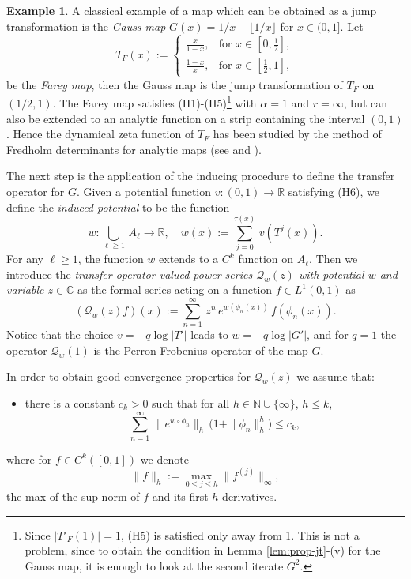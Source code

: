 \documentclass[11pt]{amsart}
\theoremstyle{definition}
\theoremstyle{remark}
\theoremstyle{definition}
\newtheorem{example}[theorem]{Example}
\numberwithin{equation}{section}
\newcommand{\R}{\mathbb R}
\newcommand{\N}{\mathbb N}
\newcommand{\C}{\mathbb C}
\newcommand{\QQ}{\mathcal{Q}}
\begin{document}
\begin{example}\label{ex:farey-gauss}
A classical example of a map which can be obtained as a jump transformation is the \emph{Gauss map} $G(x)= 1/x - \lfloor 1/x \rfloor$ for $x\in (0,1]$. Let
\begin{equation}\label{farey}
T_F(x) := \begin{cases}
\frac{x}{1-x}, & \text{for $x\in [0, \frac 12]$,}\\[0.1cm]
\frac{1-x}{x}, & \text{for $x\in [\frac 12, 1]$},
\end{cases}
\end{equation}
be the \emph{Farey map}, then the Gauss map is the jump transformation of $T_F$ on $(1/2,1)$. The Farey map satisfies (H1)-(H5)\footnote{{ Since $|T'_F(1)|=1$, (H5) is satisfied only away from 1. This is not a problem, since to obtain the condition in Lemma \ref{lem:prop-jt}-(v) for the Gauss map, it is enough to look at the second iterate $G^2$.}} with $\alpha=1$ and $r=\infty$, but can also be extended to an analytic function on a strip containing the interval $(0,1)$. Hence the dynamical zeta function of $T_F$ has been studied by the method of Fredholm determinants for analytic maps (see \cite{Ru} and \cite{BI}).
\end{example}


The next step is the application of the inducing procedure to define the transfer operator for $G$. Given a potential function $v:(0,1) \to \R$ satisfying (H6), we define the \emph{induced potential} to be the function
\begin{equation}\label{induced-pot}
w: \bigcup_{\ell\ge 1}\, A_\ell \to \R,\quad w(x) := \sum_{j=0}^{\tau(x)}\, v(T^j(x)).
\end{equation}
For any $\ell\ge 1$, the function $w$ extends to a $C^k$ function on $\overline{A_\ell}$. Then we introduce the \emph{transfer operator-valued power series $\QQ_w(z)$ with potential $w$ and variable $z\in \C$} as the formal series acting on a function $f\in L^1(0,1)$ as
\begin{equation}\label{trans-op-G}
(\QQ_w(z)f) (x) := \sum_{n=1}^\infty\, z^n\, e^{w(\phi_n(x))}\, f(\phi_n(x)). 
\end{equation}
Notice that the choice $v= -q \log |T'|$ leads to $w= -q \log |G'|$, and for $q=1$ the operator $\QQ_w(1)$ is the Perron-Frobenius operator of the map $G$. 

In order to obtain good convergence properties for $\QQ_w(z)$ we assume that:
\begin{itemize}
\item[(H7)] there is a constant $c_k>0$ such that for all $h\in \N \cup \{\infty\}$, $h\le k$,
\[
\sum_{n=1}^\infty\, \| e^{w\circ \phi_n} \|_h\, \Big( 1+ \| \phi_n \|_h^h \Big) \le c_k,
\]
\end{itemize}
where for $f\in C^k([0,1])$ we denote 
\[
\|f\|_h := \max_{0\le j\le h} \| f^{(j)}\|_\infty,
\]
 the max of the sup-norm of $f$ and its first $h$ derivatives.
\end{document}

